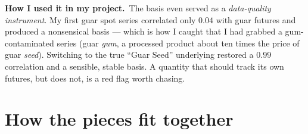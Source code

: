 \documentclass[11pt]{article}
\newcommand{\applied}{\smallskip\noindent\textbf{How I used it in my project.}\ }
\begin{document}
\applied The basis even served as a \emph{data-quality instrument}. My first guar spot series
correlated only $0.04$ with guar futures and produced a nonsensical basis --- which is how I caught
that I had grabbed a gum-contaminated series (guar \emph{gum}, a processed product about ten times
the price of guar \emph{seed}). Switching to the true ``Guar Seed'' underlying restored a $0.99$
correlation and a sensible, stable basis. A quantity that should track its own futures, but does
not, is a red flag worth chasing.

\section{How the pieces fit together}
\end{document}
